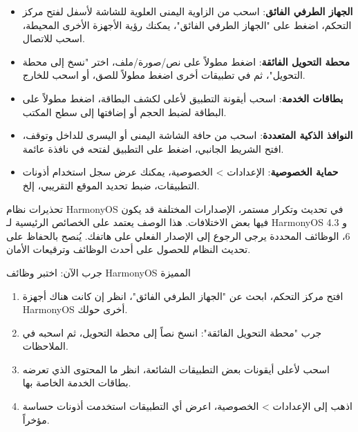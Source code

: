 
\begin{itemize}
  \item \textbf{الجهاز الطرفي الفائق}: اسحب من الزاوية اليمنى العلوية للشاشة لأسفل لفتح مركز التحكم، اضغط على "الجهاز الطرفي الفائق"، يمكنك رؤية الأجهزة الأخرى المحيطة، اسحب للاتصال.
  \item \textbf{محطة التحويل الفائقة}: اضغط مطولاً على نص/صورة/ملف، اختر "نسخ إلى محطة التحويل"، ثم في تطبيقات أخرى اضغط مطولاً للصق، أو اسحب للخارج.
  \item \textbf{بطاقات الخدمة}: اسحب أيقونة التطبيق لأعلى لكشف البطاقة، اضغط مطولاً على البطاقة لضبط الحجم أو إضافتها إلى سطح المكتب.
  \item \textbf{النوافذ الذكية المتعددة}: اسحب من حافة الشاشة اليمنى أو اليسرى للداخل وتوقف، افتح الشريط الجانبي، اضغط على التطبيق لفتحه في نافذة عائمة.
  \item \textbf{حماية الخصوصية}: الإعدادات > الخصوصية، يمكنك عرض سجل استخدام أذونات التطبيقات، ضبط تحديد الموقع التقريبي، إلخ.
\end{itemize}

\begin{tcbwarn}{تحذيرات}
نظام HarmonyOS في تحديث وتكرار مستمر، الإصدارات المختلفة قد يكون فيها بعض الاختلافات. هذا الوصف يعتمد على الخصائص الرئيسية لـ HarmonyOS 4.3 و 6، الوظائف المحددة يرجى الرجوع إلى الإصدار الفعلي على هاتفك. يُنصح بالحفاظ على تحديث النظام للحصول على أحدث الوظائف وترقيعات الأمان.

\end{tcbwarn}

\begin{tcbpractice}{جرب الآن: اختبر وظائف HarmonyOS المميزة}
\begin{enumerate}
  \item افتح مركز التحكم، ابحث عن "الجهاز الطرفي الفائق"، انظر إن كانت هناك أجهزة HarmonyOS أخرى حولك.
  \item جرب "محطة التحويل الفائقة": انسخ نصاً إلى محطة التحويل، ثم اسحبه في الملاحظات.
  \item اسحب لأعلى أيقونات بعض التطبيقات الشائعة، انظر ما المحتوى الذي تعرضه بطاقات الخدمة الخاصة بها.
  \item اذهب إلى الإعدادات > الخصوصية، اعرض أي التطبيقات استخدمت أذونات حساسة مؤخراً.
\end{enumerate}

\end{tcbpractice}
